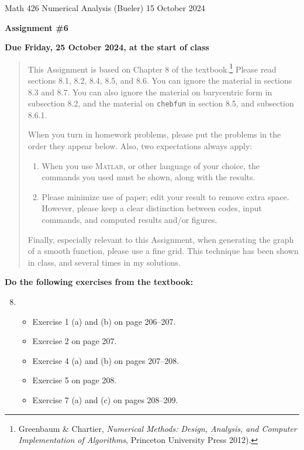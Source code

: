 \documentclass[12pt]{amsart}
\newcommand{\Matlab}{\textsc{Matlab}\xspace}
\begin{document}
\scriptsize \noindent Math 426 Numerical Analysis (Bueler) \hfill 15 October 2024
\normalsize

\medskip\bigskip

\Large\centerline{\textbf{Assignment \#6}}
\large
\bigskip

\centerline{\textbf{Due Friday, 25 October 2024, at the start of class}}
\medskip
\normalsize

\thispagestyle{empty}

\begin{quote}
{\small
This Assignment is based on Chapter 8 of the textbook.\footnote{Greenbaum \& Chartier, \emph{Numerical Methods: Design, Analysis, and Computer Implementation of Algorithms}, Princeton University Press 2012).} Please read sections 8.1, 8.2, 8.4, 8.5, and 8.6.  You can ignore the material in sections 8.3 and 8.7.  You can also ignore the material on barycentric form in subsection 8.2, and the material on \texttt{chebfun} in section 8.5, and subsection 8.6.1.

\medskip
\noindent When you turn in homework problems, please put the problems in the order they appear below.  Also, two expectations always apply:
\renewcommand{\labelenumi}{\arabic{enumi}.\,}
\begin{enumerate}
\item When you use \Matlab, or other language of your choice, the commands you used must be shown, along with the results.
\item Please minimize use of paper; edit your result to remove extra space.  However, please keep a clear distinction between codes, input commands, and computed results and/or figures.
\end{enumerate}
}

\medskip
\noindent Finally, especially relevant to this Assignment, when generating the graph of a smooth function, please use a fine grid.  This technique has been shown in class, and several times in my solutions.
\end{quote}

\bigskip
\noindent \textbf{Do the following exercises from the textbook:}

\medskip
\renewcommand{\labelenumi}{{\footnotesize\underline{\textsc{Chapter \arabic{enumi}}}}}
\begin{enumerate}
\setcounter{enumi}{7}
\item ~
    \begin{itemize}
    \item Exercise 1 (a) and (b) on page 206--207.
    \item Exercise 2 on page 207.
    \item Exercise 4 (a) and (b) on pages 207--208.
    \item Exercise 5 on page 208.
    \item Exercise 7 (a) and (c) on pages 208--209.
    \end{itemize}
\end{enumerate}
\end{document}
